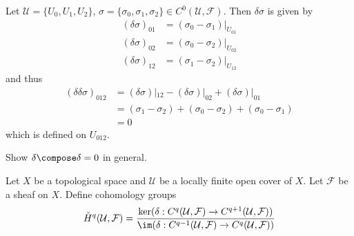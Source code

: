 \documentclass[a4paper]{article}
\begin{document}
\begin{eg}
  Let \(\mathcal U = \{U_0, U_1, U_2\}\), \(\sigma = \{\sigma_0, \sigma_1, \sigma_2\} \in C^0(\mathcal U, \mathcal F)\). Then \(\delta \sigma\) is given by
  \begin{align*}
    (\delta \sigma)_{01} &= (\sigma_0 - \sigma_1)|_{U_{01}} \\
    (\delta \sigma)_{02} &= (\sigma_0 - \sigma_2)|_{U_{02}} \\
    (\delta \sigma)_{12} &= (\sigma_1 - \sigma_2)|_{U_{12}}
  \end{align*}
  and thus
  \begin{align*}
    (\delta \delta \sigma)_{012}
    &= (\delta \sigma)|_{12} - (\delta \sigma)|_{02} + (\delta \sigma)|_{01} \\
    &= (\sigma_1 - \sigma_2) + (\sigma_0 - \sigma_2) + (\sigma_0 - \sigma_1) \\
    &= 0
  \end{align*}
  which is defined on \(U_{012}\).
\end{eg}

\begin{ex}
  Show \(\delta \compose \delta = 0\) in general.
\end{ex}

\begin{definition}
  Let \(X\) be a topological space and \(\mathcal U\) be a locally finite open cover of \(X\). Let \(\mathcal F\) be a sheaf on \(X\). Define cohomology groups
  \[
    \check H^q(\mathcal U, \mathcal F)
    = \frac{\ker (\delta: C^q(\mathcal U, \mathcal F) \to C^{q + 1}(\mathcal U, \mathcal F))}{\im (\delta: C^{q - 1}(\mathcal U, \mathcal F) \to C^q(\mathcal U, \mathcal F))}
  \]
\end{definition}
\end{document}
